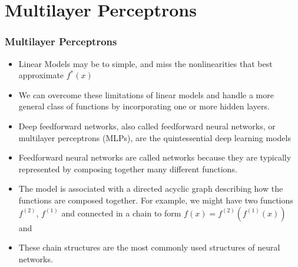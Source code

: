 \documentclass[
  shownotes,
  xcolor={svgnames},
  hyperref={colorlinks,citecolor=DarkBlue,linkcolor=DarkRed,urlcolor=DarkBlue}
  , aspectratio=169]{beamer}
\begin{document}
\section{Multilayer Perceptrons}
\begin{frame}
\frametitle{Multilayer Perceptrons}

\begin{itemize}
    \item Linear Models may be to simple, and miss the nonlinearities that best approximate $f^*(x)$
    \medskip
    \item We can overcome these limitations of linear models and handle a more general class of functions by incorporating one or more hidden layers.
    \medskip
    \item Deep feedforward networks, also called feedforward neural networks, or
multilayer perceptrons (MLPs), are the quintessential deep learning models
\medskip
\item Feedforward neural networks are called
networks because they are typically represented by composing together many diﬀerent functions. 
\item The model is associated with a directed acyclic graph describing how the functions are composed together. For example, we might have two functions $f^{(2)}$, $f^{(1)}$ and connected in a chain to form $f(x)=f^{(2)}(f^{(1)}(x))$ and
 \item These chain structures are the most commonly used structures of neural networks. 
\end{itemize}
\end{frame}
\end{document}

